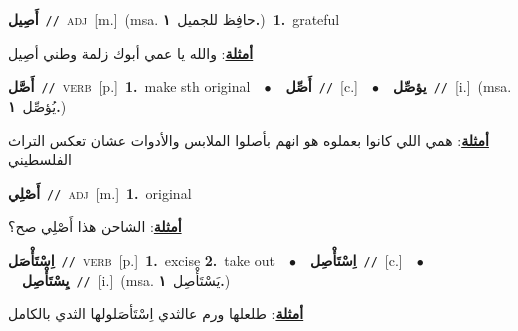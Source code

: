 \documentclass[10pt,a4paper,twoside]{article} %
\begin{document}
\begin{multicols}{2}
{\setlength\topsep{0pt}\textbf{\foreignlanguage{arabic}{أَصِيل}}\ {\color{gray}\texttt{//}\color{black}}\ \textsc{adj}\ [m.]\ \color{gray}(msa. \foreignlanguage{arabic}{حافِظ للجميل}~\foreignlanguage{arabic}{\textbf{١.}})\color{black}\ \textbf{1.}~grateful\  \begin{flushright}\color{gray}\foreignlanguage{arabic}{\textbf{\underline{\foreignlanguage{arabic}{أمثلة}}}: والله يا عمي أبوك زلمة وطني أصِيل}\end{flushright}\color{black}} \vspace{2mm}

{\setlength\topsep{0pt}\textbf{\foreignlanguage{arabic}{أَصَّل}}\ {\color{gray}\texttt{//}\color{black}}\ \textsc{verb}\ [p.]\ \textbf{1.}~make sth original\ \ $\bullet$\ \ \setlength\topsep{0pt}\textbf{\foreignlanguage{arabic}{أَصِّل}}\ {\color{gray}\texttt{//}\color{black}}\ [c.]\ \ $\bullet$\ \ \setlength\topsep{0pt}\textbf{\foreignlanguage{arabic}{يؤصِّل}}\ {\color{gray}\texttt{//}\color{black}}\ [i.]\ \color{gray}(msa. \foreignlanguage{arabic}{يُؤصِّل}~\foreignlanguage{arabic}{\textbf{١.}})\color{black}\  \begin{flushright}\color{gray}\foreignlanguage{arabic}{\textbf{\underline{\foreignlanguage{arabic}{أمثلة}}}: همي اللي كانوا بعملوه هو انهم بأصلوا الملابس والأدوات عشان تعكس التراث الفلسطيني}\end{flushright}\color{black}} \vspace{2mm}

{\setlength\topsep{0pt}\textbf{\foreignlanguage{arabic}{أَصْلِي}}\ {\color{gray}\texttt{//}\color{black}}\ \textsc{adj}\ [m.]\ \textbf{1.}~original\  \begin{flushright}\color{gray}\foreignlanguage{arabic}{\textbf{\underline{\foreignlanguage{arabic}{أمثلة}}}: الشاحن هذا أَصْلِي صح؟}\end{flushright}\color{black}} \vspace{2mm}

{\setlength\topsep{0pt}\textbf{\foreignlanguage{arabic}{اِسْتَأْصَل}}\ {\color{gray}\texttt{//}\color{black}}\ \textsc{verb}\ [p.]\ \textbf{1.}~excise  \textbf{2.}~take out\ \ $\bullet$\ \ \setlength\topsep{0pt}\textbf{\foreignlanguage{arabic}{اِسْتَأْصِل}}\ {\color{gray}\texttt{//}\color{black}}\ [c.]\ \ $\bullet$\ \ \setlength\topsep{0pt}\textbf{\foreignlanguage{arabic}{يِسْتَأْصِل}}\ {\color{gray}\texttt{//}\color{black}}\ [i.]\ \color{gray}(msa. \foreignlanguage{arabic}{يَسْتَأْصِل}~\foreignlanguage{arabic}{\textbf{١.}})\color{black}\  \begin{flushright}\color{gray}\foreignlanguage{arabic}{\textbf{\underline{\foreignlanguage{arabic}{أمثلة}}}: طلعلها ورم عالثدي اِسْتَأصَلولها الثدي بالكامل}\end{flushright}\color{black}} \vspace{2mm}


\end{multicols}
\end{document}
